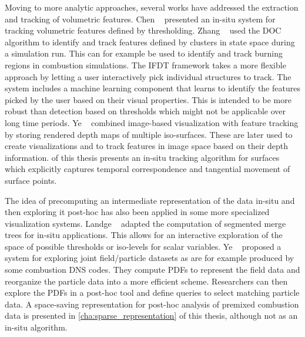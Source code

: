 %
Moving to more analytic approaches, several works have addressed the extraction
and tracking of volumetric features.
%
Chen \etal~\cite{Chen2003} presented an in-situ system for tracking volumetric
features defined by thresholding.
%
Zhang \etal~\cite{Zhang2012} used the \ac{DOC} algorithm \cite{Quiroz2008} to
identify and track features defined by clusters in state space during a
simulation run.
%
This can for example be used to identify and track burning regions in combustion
simulations.
%
The IFDT framework \cite{Duque2012} takes a more flexible approach by letting a
user interactively pick individual structures to track.
%
The system includes a machine learning component that learns to identify the
features picked by the user based on their visual properties.
%
This is intended to be more robust than detection based on thresholds which
might not be applicable over long time periods.
%
Ye \etal~\cite{Ye2015} combined image-based visualization with feature tracking
by storing rendered depth maps of multiple iso-surfaces.
%
These are later used to create visualizations and to track features in image
space based on their depth information.
%
 of this thesis presents an in-situ tracking
algorithm for surfaces which explicitly captures temporal correspondence and
tangential movement of surface points.
%

%
The idea of precomputing an intermediate representation of the data in-situ and
then exploring it post-hoc has also been applied in some more specialized
visualization systems.
%
Landge \etal~\cite{Landge2014} adapted the computation of segmented merge trees
\cite{Bremer2009,Bremer2011} for in-situ applications.
%
This allows for an interactive exploration of the space of possible thresholds
or iso-levels for scalar variables.
%
Ye \etal~\cite{Ye2016} proposed a system for exploring joint field/particle
datasets as are for example produced by some combustion \ac{DNS} codes.
%
They compute \acp{PDF} to represent the field data and reorganize the particle
data into a more efficient scheme.
%
Researchers can then explore the \acp{PDF} in a post-hoc tool and define queries
to select matching particle data.
%
A space-saving representation for post-hoc analysis of premixed combustion data
is presented in \cref{cha:sparse_representation} of this thesis, although not as
an in-situ algorithm.
%
%
%
%
